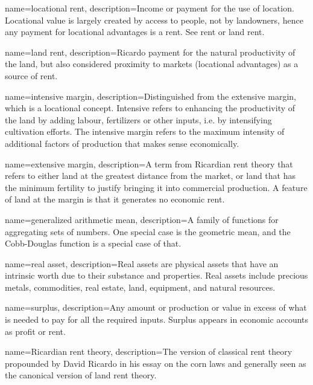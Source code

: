 {
name=locational rent,
description={Income or payment for the use of location. Locational value is largely created by access to people, not by landowners, hence any payment for locational advantages is a rent. See \gls{rent} or \gls{land rent}.}
}

{
name=land rent,
description={Ricardo payment for  the natural productivity of the land, but also considered proximity to markets (locational advantages) as a source of rent. }
}

{
name=intensive margin,
description={Distinguished from the \gls{extensive margin}, which is a locational concept. Intensive refers to enhancing the productivity of the land by adding labour, fertilizers or other inputs, i.e. by intensifying cultivation efforts.  The intensive margin refers to the maximum intensity of additional factors of production that makes sense economically. }
}

{
name=extensive margin,
description={A term from Ricardian rent theory that refers to either land at the greatest distance from the market, or land that has the minimum fertility to justify bringing it into commercial production. A feature of land at the margin is that it generates no \gls{economic rent}.}
}

{
name=generalized arithmetic mean,
description={A family of functions for aggregating sets of numbers. One special case is the geometric mean,  and the Cobb-Douglas function is a special case of that.} %
}


{
name=real asset, 
description={Real assets are physical assets that have an intrinsic worth due to their substance and properties. Real assets include precious metals, commodities, real estate, land, equipment, and natural resources. }
}



{
name=surplus,
description={Any amount or production or value in excess of what is needed to pay for all the required inputs. Surplus appears in economic accounts as profit or rent. }
}

{
name=Ricardian rent theory,
description={The version of classical rent theory propounded by David Ricardo in his essay on the corn laws and generally seen as the canonical version of land rent theory.}
}

